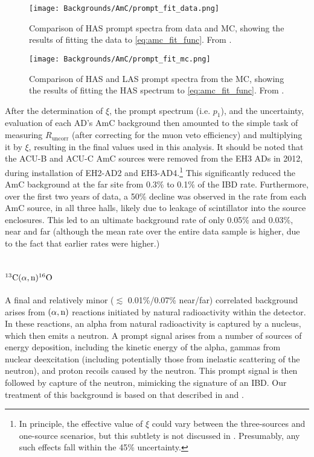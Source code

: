 \documentclass[../thesis.tex]{subfiles}
\begin{document}
\begin{figure}[ht]
  \texttt{[image: Backgrounds/AmC/prompt\_fit\_data.png]}
  \caption{Comparison of HAS prompt spectra from data and MC, showing the results of fitting the data to \autoref{eq:amc_fit_func}. From \cite{Gu_2016}.}
  \label{fig:amc_prompt_fit_data}
\end{figure}

\begin{figure}[ht]
  \texttt{[image: Backgrounds/AmC/prompt\_fit\_mc.png]}
  \caption{Comparison of HAS and LAS prompt spectra from the MC, showing the results of fitting the HAS spectrum to \autoref{eq:amc_fit_func}. From \cite{Gu_2016}.}
  \label{fig:amc_prompt_fit_mc}
\end{figure}

After the determination of $\xi$, the prompt spectrum (i.e. $p_1$), and the uncertainty, evaluation of each AD's AmC background then amounted to the simple task of measuring $R_{\mathrm{uncorr}}$ (after correcting for the muon veto efficiency) and multiplying it by $\xi$, resulting in the final values used in this analysis. It should be noted that the ACU-B and ACU-C AmC sources were removed from the EH3 ADs in 2012, during installation of EH2-AD2 and EH3-AD4.\footnote{In principle, the effective value of $\xi$ could vary between the three-sources and one-source scenarios, but this subtlety is not discussed in \cite{Gu_2016}. Presumably, any such effects fall within the 45\% uncertainty.} This significantly reduced the AmC background at the far site from 0.3\% to 0.1\% of the IBD rate. Furthermore, over the first two years of data, a 50\% decline was observed in the rate from each AmC source, in all three halls, likely due to leakage of scintillator into the source enclosures. This led to an ultimate background rate of only 0.05\% and 0.03\%, near and far (although the mean rate over the entire data sample is higher, due to the fact that earlier rates were higher.)

\section{$^{13}\mathrm{C}(\alpha, \mathrm{n})^{16}\mathrm{O}$}
\label{sec:bkgCanO}

A final and relatively minor ($\lesssim$ 0.01\%/0.07\% near/far) correlated background arises from $(\alpha,\mathrm{n})$ reactions initiated by natural radioactivity within the detector. In these reactions, an alpha from natural radioactivity is captured by a nucleus, which then emits a neutron. A prompt signal arises from a number of sources of energy deposition, including the kinetic energy of the alpha, gammas from nuclear deexcitation (including potentially those from inelastic scattering of the neutron), and proton recoils caused by the neutron. This prompt signal is then followed by capture of the neutron, mimicking the signature of an IBD. Our treatment of this background is based on that described in \cite{Zhao_2014} and \cite{An_2017}.
\end{document}
